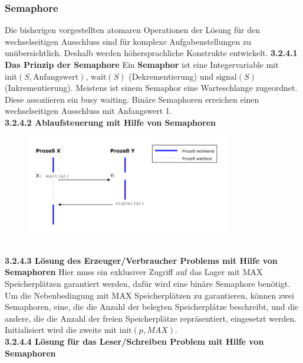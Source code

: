 \documentclass{article}
\begin{document}
\subsubsection{Semaphore}
    Die bisherigen vorgestellten atomaren Operationen der Lösung für den wechselseitigen Ausschluss sind für komplexe Aufgabenstellungen zu unübersichtlich. Deshalb werden höhersprachliche Konstrukte entwickelt.\newline
    \textbf{3.2.4.1 Das Prinzip der Semaphore}\newline
    Ein \textbf{Semaphor} ist eine Integervariable mit $\text{init}(S, \text{Anfangswert})$, $\text{wait}(S)$ (Dekrementierung) und $\text{signal}(S)$ (Inkrementierung). Meistens ist einem Semaphor eine Warteschlange zugeordnet. Diese assoziieren ein busy waiting.\newline
    Binäre Semaphoren erreichen einen wechselseitigen Ausschluss mit Anfangswert 1.\newline
    \\
    \textbf{3.2.4.2 Ablaufsteuerung mit Hilfe von Semaphoren}\newline
    \begin{figure}[H]
        \centering
	    \includegraphics[width=90mm]{Skizzen/3_Kapitel/Ablaufsteuerung.png}
    \end{figure}\newline
    \\
    \textbf{3.2.4.3 Lösung des Erzeuger/Verbraucher Problems mit Hilfe von Semaphoren}\newline
    Hier muss ein exklusiver Zugriff auf das Lager mit MAX Speicherplätzen garantiert werden, dafür wird eine binäre Semaphore benötigt. Um die Nebenbedingung mit MAX Speicherplätzen zu garantieren, können zwei Semaphoren, eine, die die Anzahl der belegten Speicherplätze beschreibt, und die andere, die die Anzahl der freien Speicherplätze repräsentiert, eingesetzt werden. Initialisiert wird die zweite mit $\text{init}(p, MAX)$.\newline 
    \\
    \textbf{3.2.4.4 Lösung für das Leser/Schreiben Problem mit Hilfe von Semaphoren}\newline
\end{document}
